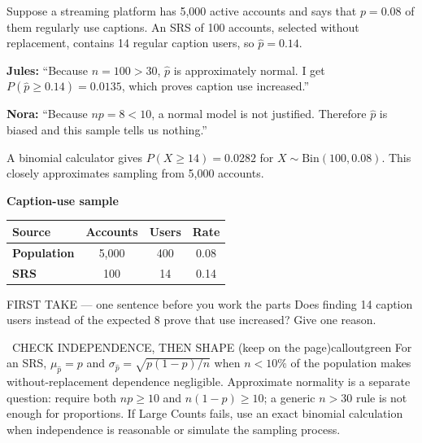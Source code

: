 \documentclass[11pt]{article}
\begin{document}


Suppose a streaming platform has 5,000 active accounts and says that $p=0.08$ of them regularly use captions. An SRS of 100 accounts, selected without replacement, contains 14 regular caption users, so $\widehat p=0.14$.\par\smallskip \textbf{Jules:} ``Because $n=100>30$, $\widehat p$ is approximately normal. I get $P(\widehat p\geq0.14)=0.0135$, which proves caption use increased.''\par \textbf{Nora:} ``Because $np=8<10$, a normal model is not justified. Therefore $\widehat p$ is biased and this sample tells us nothing.''\par\smallskip A binomial calculator gives $P(X\geq14)=0.0282$ for $X\sim\mathrm{Bin}(100,0.08)$. This closely approximates sampling from 5,000 accounts.\par
\begin{center}
\textbf{Caption-use sample}\par\smallskip
\begin{tabular}{|l|c|c|c|}
\hline
\textbf{Source} & \textbf{Accounts} & \textbf{Users} & \textbf{Rate} \\ \hline
\textbf{Population} & 5,000 & 400 & 0.08 \\ \hline
\textbf{SRS} & 100 & 14 & 0.14 \\ \hline
\end{tabular}
\end{center}
\begin{firsttakebox}{FIRST TAKE --- one sentence before you work the parts}
Does finding 14 caption users instead of the expected 8 prove that use increased? Give one reason.
\workspace{0.9in}
\end{firsttakebox}

\begin{callout}{\IconBook\ CHECK INDEPENDENCE, THEN SHAPE (keep on the page)}{calloutgreen}
For an SRS, $\mu_{\widehat p}=p$ and $\sigma_{\widehat p}=\sqrt{p(1-p)/n}$ when $n<10\%$ of the
population makes without-replacement dependence negligible. Approximate normality is a separate question:
require both $np\geq10$ and $n(1-p)\geq10$; a generic $n>30$ rule is not enough for proportions.
If Large Counts fails, use an exact binomial calculation when independence is reasonable or simulate the sampling process.
\end{callout}
\end{document}
